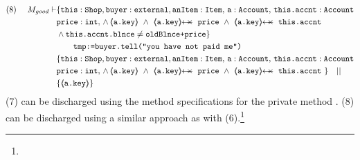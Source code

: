 \begin{proofO}
\begin{align*}
\text{(8)}  \ \ \ \ M_{good} \vdash & \{  \prg{this}:\prg{Shop}, \prg{buyer} : \prg{external}, \prg{anItem} : \prg{Item},\, \prg{a}:\prg{Account},\, \prg{this.accnt}:\prg{Account}\\
				& \prg{price} : \prg{int},\,
				  \wedge\, 
				  {\inside{\prg{a.key}}}\ \wedge\ 
				  \protectedFrom{\prg{a.key}}{\prg{price}}\ \wedge\ 
				   \protectedFrom{\prg{a.key}}{\prg{this.accnt}} \\
				& \wedge \prg{this.accnt.blnce} \neq \prg{oldBlnce+price}\} \\
		  		&\SPTG  \prg{tmp:=buyer.tell("you have not paid me")}\ \\  
		  		& \{  \prg{this}:\prg{Shop}, \prg{buyer} : \prg{external}, \prg{anItem} : \prg{Item},\, \prg{a}:\prg{Account},\, \prg{this.accnt}:\prg{Account}\\
				& \prg{price} : \prg{int},\,
				  \wedge\, 
				  {\inside{\prg{a.key}}}\ \wedge\ 
				  \protectedFrom{\prg{a.key}}{\prg{price}}\ \wedge\ 
				   \protectedFrom{\prg{a.key}}{\prg{this.accnt}}\ \} \ \ \  || \ \ \ \\
		  		& \{ {\inside{\prg{a.key}}} \}
\end{align*}
\normalsize
(7) can be discharged using the method specifications for the private method . (8) can be discharged using a similar approach as with (6).\footnote{}


\end{proofO}
